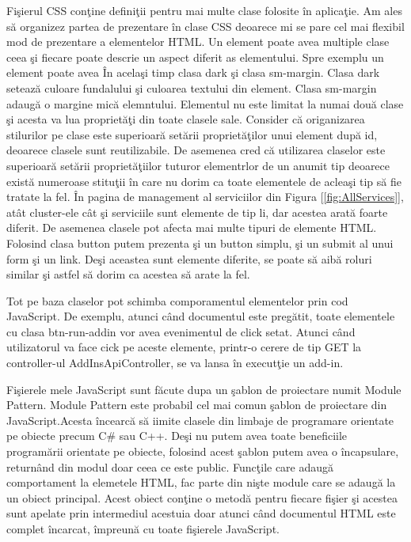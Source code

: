 \documentclass[a4paper,12pt]{report}
\let\oldref\ref
\renewcommand{\ref}[1]{[\oldref{#1}]}
\begin{document}
Fi\c sierul CSS con\c tine defini\c tii pentru mai multe clase folosite \^in aplica\c tie. Am ales s\u a organizez 
partea de prezentare \^in clase CSS deoarece mi se pare cel mai flexibil mod de prezentare a elementelor HTML.
Un element poate avea multiple clase ceea \c si fiecare poate descrie un aspect diferit as elementului.
Spre exemplu un element poate avea \^In acela\c si timp clasa dark \c si clasa sm-margin. Clasa dark seteaz\u a culoare fundalului \c si culoarea
textului din element. Clasa sm-margin adaug\u a o margine mic\u a elemntului. Elementul nu este limitat la numai dou\u a clase \c si 
acesta va lua propriet\u a\c ti din toate clasele sale. Consider c\u a origanizarea stilurilor pe clase este superioar\u a
set\u arii propriet\u a\c tilor unui element dup\u a id, deoarece clasele sunt reutilizabile. De asemenea 
cred c\u a utilizarea claselor este superioar\u a set\u arii propriet\u a\c tiilor tuturor elementrlor de un anumit 
tip deoarece exist\u a numeroase stitu\c tii \^in care nu dorim ca toate elementele de aclea\c si tip s\u a fie tratate la fel.
\^In pagina de management al serviciilor din Figura \ref{fig:AllServices}, at\^at cluster-ele c\^at \c si 
serviciile sunt elemente de tip li, dar acestea arat\u a foarte diferit.  De asemenea clasele pot afecta 
mai multe tipuri de elemente HTML. Folosind clasa button putem prezenta \c si un button simplu, \c si un submit 
al unui form \c si un link. De\c si aceastea sunt elemente diferite, se poate s\u a aib\u a roluri similar
\c si astfel s\u a dorim ca acestea s\u a arate la fel.

Tot pe baza claselor pot schimba comporamentul elementelor prin cod JavaScript. De exemplu,
atunci c\^and documentul este preg\u atit, toate elementele cu clasa btn-run-addin vor avea 
evenimentul de click setat. Atunci c\^and utilizatorul va face cick pe aceste elemente, printr-o cerere 
de tip GET la controller-ul AddInsApiController, se va lansa \^in execut\c tie un add-in.

Fi\c sierele mele JavaScript sunt f\u acute dupa un \c sablon de proiectare numit Module Pattern. Module Pattern 
este probabil cel mai comun \c sablon de proiectare din  JavaScript.Acesta \^incearc\u a s\u a iimite clasele din limbaje de programare 
orientate pe obiecte precum C\# sau C++. De\c si nu putem avea toate beneficiile program\u arii orientate pe obiecte, 
folosind acest \c sablon putem avea o \^incapsulare, return\^and din modul doar ceea ce este public.
Func\c tile care adaug\u a comportament la elemetele HTML, fac parte din ni\c ste module care 
se adaug\u a la un obiect principal. Acest obiect con\c tine o metod\u a pentru fiecare fi\c sier 
\c si acestea sunt apelate prin intermediul acestuia doar atunci c\^and documentul HTML este complet \^incarcat, \^impreun\u a cu
toate fi\c sierele JavaScript.
\end{document}
